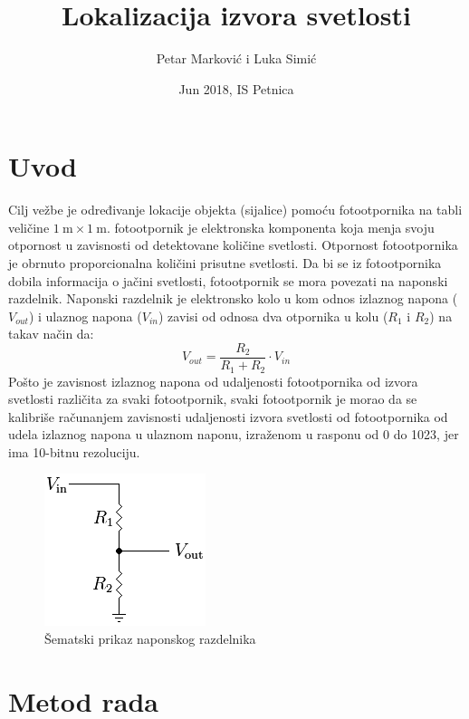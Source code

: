 \documentclass{article}
\title{Lokalizacija izvora svetlosti}
\author{Petar Marković i Luka Simić}
\date{Jun 2018, IS Petnica}
\begin{document}
\maketitle

\section{Uvod}
    Cilj vežbe je određivanje lokacije objekta (sijalice) pomoću fotootpornika na tabli veličine $\SI{1}{\meter} \times \SI{1}{\meter}$.
    fotootpornik je elektronska komponenta koja menja svoju otpornost u zavisnosti od detektovane količine svetlosti. Otpornost fotootpornika je obrnuto proporcionalna količini prisutne svetlosti.
    Da bi se iz fotootpornika dobila informacija o jačini svetlosti, fotootpornik se mora povezati na naponski razdelnik. Naponski razdelnik je elektronsko kolo u kom odnos izlaznog napona ($V_{out}$) i ulaznog napona ($V_{in}$) zavisi od odnosa dva otpornika u kolu ($R_1$ i $R_2$) na takav način da:
    $$V_{out} = \frac{R_2}{R_1 + R_2} \cdot V_{in}$$
    Pošto je zavisnost izlaznog napona od udaljenosti fotootpornika od izvora svetlosti različita za svaki fotootpornik, svaki fotootpornik je morao da se kalibriše računanjem zavisnosti udaljenosti izvora svetlosti od fotootpornika od udela izlaznog napona u ulaznom naponu, izraženom u rasponu od 0 do 1023, jer ima 10-bitnu rezoluciju.%
    \begin{figure}[H]
        \centering
        \includegraphics[scale=0.5]{razdelnik.png}
        \caption{Šematski prikaz naponskog razdelnika}
        \label{Razdelnik}
    \end{figure}

\section{Metod rada}
\end{document}
